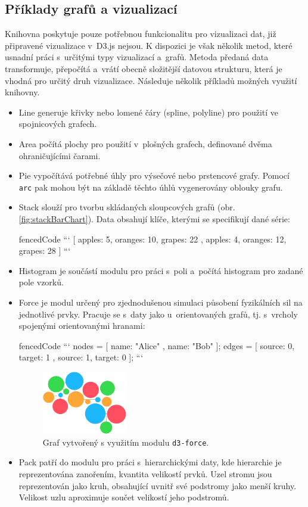 \documentclass[
  digital, %
  oneside, %
  table,   %
  nolof,     %
  nolot,     %
]{fithesis3}
\begin{document}
\subsection{Příklady grafů a vizualizací}\label{d3jsGraphs}
Knihovna poskytuje pouze potřebnou funkcionalitu pro vizualizaci dat, již připravené vizualizace v~D3.js nejsou. K dispozici je však několik metod, které usnadní práci s~určitými typy vizualizací a~grafů. Metoda předaná data transformuje, přepočítá a~vrátí obecně složitější datovou strukturu, která je vhodná pro určitý druh vizualizace. Následuje několik příkladů možných využití knihovny. \cite{d3APIReference}
\begin{itemize}
  \item Line generuje křivky nebo lomené čáry (spline, polyline) pro použití ve spojnicových grafech.
  \item Area počítá plochy pro použití v~plošných grafech, definované dvěma ohraničujícími čarami.
  \item Pie vypočítává potřebné úhly pro výsečové nebo prstencové grafy. Pomocí \verb|arc| pak mohou být na základě těchto úhlů vygenerovány oblouky grafu.
  \item Stack slouží pro tvorbu skládaných sloupcových grafů (obr. \ref{fig:stackBarChart}). Data obsahují klíče, kterými se specifikují dané série:
\begin{markdown*}{
  fencedCode
}
```
	[{ apples: 5, oranges: 10, grapes: 22 },
	{ apples: 4, oranges: 12, grapes: 28 }]
```
\end{markdown*}
  \item Histogram je součástí modulu pro práci s~poli a~počítá histogram pro zadané pole vzorků.
  \item Force je modul určený pro zjednodušenou simulaci působení fyzikálních sil na jednotlivé prvky. Pracuje se s~daty jako u~orientovaných grafů, tj. s~vrcholy spojenými orientovanými hranami:
\begin{markdown*}{
  fencedCode
}
```
	nodes = [{ name: "Alice" }, { name: "Bob" }];
	edges = [{ source: 0, target: 1 },
			 { source: 1, target: 0 }];
```
\end{markdown*}
\begin{figure}[H]
  \begin{center}
    \includegraphics[width=3.7cm]{images/force.pdf}
  \end{center}
  \caption{Graf vytvořený s využitím modulu \texttt{d3-force}.}
  \label{fig:forceGraph}
\end{figure}
  \item Pack patří do modulu pro práci s~hierarchickými daty, kde hierarchie je reprezentována zanořením, kvantita velikostí prvků. Uzel stromu jsou reprezentován jako kruh, obsahující uvnitř své podstromy jako menší kruhy. Velikost uzlu aproximuje součet velikostí jeho podstromů.
\end{itemize}
\end{document}
